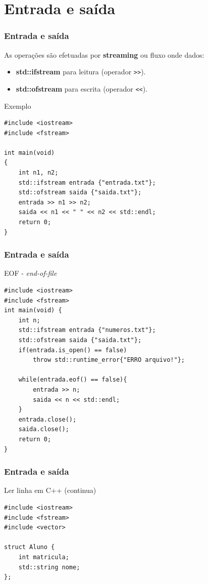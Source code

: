 \documentclass[xcolor={usenames,dvipsnames},10pt,presentation,aspectratio=169]{beamer}
\begin{document}
\section{Entrada e saída}
\begin{frame}[fragile]
  \frametitle{Entrada e saída}
As operações são efetuadas por \textbf{streaming} ou fluxo onde dados:
\begin{itemize}
\item \textbf{std::ifstream} para leitura (operador \verb+>>+).
\item \textbf{std::ofstream} para escrita (operador \verb+<<+).
\end{itemize}
  \begin{block}{Exemplo}
\begin{lstlisting}
#include <iostream>
#include <fstream>

int main(void)
{
    int n1, n2;
    std::ifstream entrada {"entrada.txt"};
    std::ofstream saida {"saida.txt"};
    entrada >> n1 >> n2;
    saida << n1 << " " << n2 << std::endl;
    return 0;
}
\end{lstlisting}
  \end{block}
\end{frame}
\begin{frame}[fragile]
  \frametitle{Entrada e saída}
  \begin{block}{EOF - \emph{end-of-file}}
\begin{lstlisting}
#include <iostream>
#include <fstream>
int main(void) {
    int n;
    std::ifstream entrada {"numeros.txt"};
    std::ofstream saida {"saida.txt"};
    if(entrada.is_open() == false)
        throw std::runtime_error{"ERRO arquivo!"};

    while(entrada.eof() == false){
        entrada >> n;
        saida << n << std::endl;
    }
    entrada.close();
    saida.close();
    return 0;
}
\end{lstlisting}
  \end{block}
\end{frame}
\begin{frame}[fragile]
  \frametitle{Entrada e saída}
  \begin{block}{Ler linha em C++ (continua)}
\begin{lstlisting}
#include <iostream>
#include <fstream>
#include <vector>

struct Aluno {
    int matricula;
    std::string nome;
};
\end{lstlisting}
  \end{block}
\end{frame}
\end{document}
